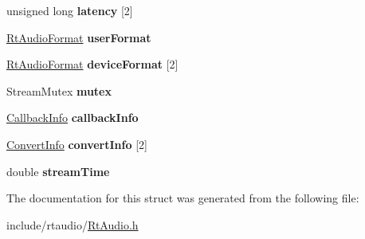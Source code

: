 \begin{DoxyCompactItemize}
\item 
unsigned long {\bfseries latency} \mbox{[}2\mbox{]}\hypertarget{struct_rt_api_1_1_rt_api_stream_a18e198e9cd90da09b380ebe54fc6cd05}{}\label{struct_rt_api_1_1_rt_api_stream_a18e198e9cd90da09b380ebe54fc6cd05}

\item 
\hyperlink{_rt_audio_8h_aafca92882d25915560018873221e44b8}{Rt\+Audio\+Format} {\bfseries user\+Format}\hypertarget{struct_rt_api_1_1_rt_api_stream_adc6fab24ece3a7e0318f77d687f90866}{}\label{struct_rt_api_1_1_rt_api_stream_adc6fab24ece3a7e0318f77d687f90866}

\item 
\hyperlink{_rt_audio_8h_aafca92882d25915560018873221e44b8}{Rt\+Audio\+Format} {\bfseries device\+Format} \mbox{[}2\mbox{]}\hypertarget{struct_rt_api_1_1_rt_api_stream_a9eb0511e02ce60efb17fa6725fd4bea3}{}\label{struct_rt_api_1_1_rt_api_stream_a9eb0511e02ce60efb17fa6725fd4bea3}

\item 
Stream\+Mutex {\bfseries mutex}\hypertarget{struct_rt_api_1_1_rt_api_stream_a8b7f7b5ada995d6885a76ac09fdc0a58}{}\label{struct_rt_api_1_1_rt_api_stream_a8b7f7b5ada995d6885a76ac09fdc0a58}

\item 
\hyperlink{struct_callback_info}{Callback\+Info} {\bfseries callback\+Info}\hypertarget{struct_rt_api_1_1_rt_api_stream_ab6194fc15a14da5667c493502380ec6d}{}\label{struct_rt_api_1_1_rt_api_stream_ab6194fc15a14da5667c493502380ec6d}

\item 
\hyperlink{struct_rt_api_1_1_convert_info}{Convert\+Info} {\bfseries convert\+Info} \mbox{[}2\mbox{]}\hypertarget{struct_rt_api_1_1_rt_api_stream_a28b8a898ae50d607976b8d7c56422c52}{}\label{struct_rt_api_1_1_rt_api_stream_a28b8a898ae50d607976b8d7c56422c52}

\item 
double {\bfseries stream\+Time}\hypertarget{struct_rt_api_1_1_rt_api_stream_a517fc9043b838bea61d32e8f9f156fdb}{}\label{struct_rt_api_1_1_rt_api_stream_a517fc9043b838bea61d32e8f9f156fdb}

\end{DoxyCompactItemize}


The documentation for this struct was generated from the following file\+:\begin{DoxyCompactItemize}
\item 
include/rtaudio/\hyperlink{_rt_audio_8h}{Rt\+Audio.\+h}\end{DoxyCompactItemize}
